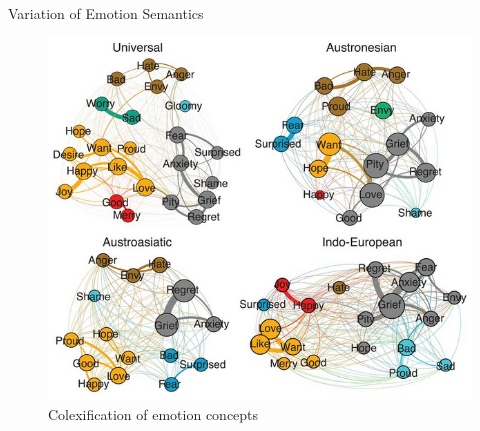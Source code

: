 \begin{frame}{Variation of Emotion Semantics}
\vspace*{-0.3cm}
	\begin{figure}
		\includegraphics[height=0.75\textheight]{images/jackson.png}
		\caption{Colexification of emotion concepts \parencite{Jackson2019}}
	\end{figure}
\end{frame}

	